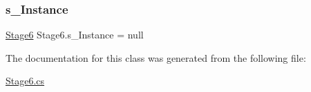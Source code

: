 \subsubsection{\texorpdfstring{s\+\_\+\+Instance}{s\_Instance}}
{\footnotesize\ttfamily \mbox{\hyperlink{class_stage6}{Stage6}} Stage6.\+s\+\_\+\+Instance = null\hspace{0.3cm}{\ttfamily [static]}}



The documentation for this class was generated from the following file\+:\begin{DoxyCompactItemize}
\item 
\mbox{\hyperlink{_stage6_8cs}{Stage6.\+cs}}\end{DoxyCompactItemize}
